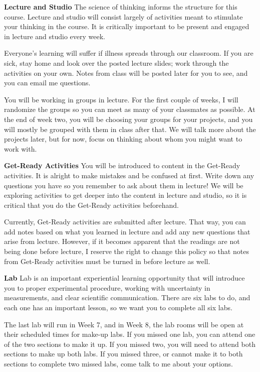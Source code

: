 \documentclass[]{article}
\begin{document}
\newpage
\begin{TeacherMargin}
\noindent\textbf{Lecture and Studio} The science of thinking informs the structure for this course. Lecture and studio will consist largely of activities meant to stimulate your thinking in the course. It is critically important to be present and engaged in lecture and studio every week.

Everyone's learning will suffer if illness spreads through our classroom. If you are sick, stay home and look over the posted lecture slides; work through the activities on your own. Notes from class will be posted later for you to see, and you can email me questions.

You will be working in groups in lecture. For the first couple of weeks, I will randomize the groups so you can meet as many of your classmates as possible. At the end of week two, you will be choosing your groups for your projects, and you will mostly be grouped with them in class after that. We will talk more about the projects later, but for now, focus on thinking about whom you might want to work with.

\noindent\textbf{Get-Ready Activities} You will be introduced to content in the Get-Ready activities. It is alright to make mistakes and be confused at first. Write down any questions you have so you remember to ask about them in lecture! We will be exploring activities to get deeper into the content in lecture and studio, so it is critical that you do the Get-Ready activities beforehand.

Currently, Get-Ready activities are submitted after lecture. That way, you can add notes based on what you learned in lecture and add any new questions that arise from lecture. However, if it becomes apparent that the readings are not being done before lecture, I reserve the right to change this policy so that notes from Get-Ready activities must be turned in before lecture as well.

\noindent\textbf{Lab} Lab is an important experiential learning opportunity that will introduce you to proper experimental procedure, working with uncertainty in measurements, and clear scientific communication. There are six labs to do, and each one has an important lesson, so we want you to complete all six labs.

The last lab will run in Week 7, and in Week 8, the lab rooms will be open at their scheduled times for make-up labs. If you missed one lab, you can attend one of the two sections to make it up. If you missed two, you will need to attend both sections to make up both labs. If you missed three, or cannot make it to both sections to complete two missed labs, come talk to me about your options.


\end{TeacherMargin}
\end{document}
